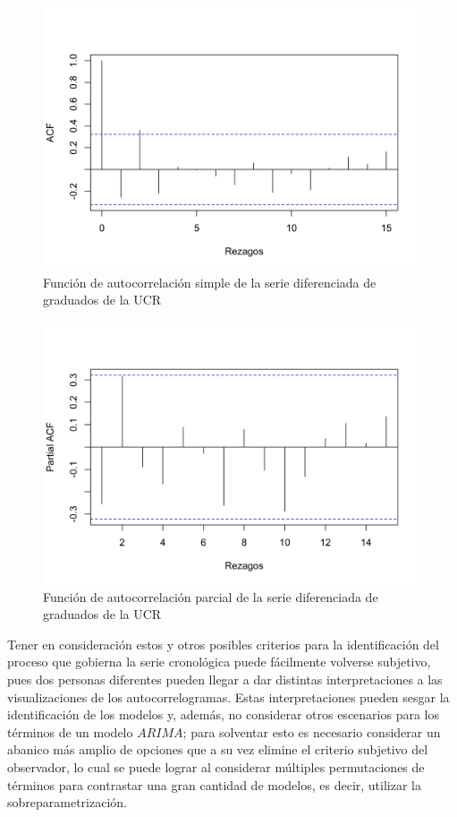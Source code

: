 \documentclass[
]{article}
\begin{document}
\begin{figure}[H]
\includegraphics[width=1\linewidth,height=1\textheight]{Tesis_files/figure-latex/auto_ucr2-1} \caption{Función de autocorrelación simple de la serie diferenciada de graduados de la UCR \textcolor{white}{prueba de aaaaaaaaaaaaaaaaaaaaaaa}}\label{fig:auto_ucr2}
\end{figure}

\begin{figure}[H]
\includegraphics[width=1\linewidth,height=1\textheight]{Tesis_files/figure-latex/parcial_ucr2-1} \caption{Función de autocorrelación parcial de la serie diferenciada de graduados de la UCR \textcolor{white}{prueba de aaaaaaaaaaaaaaaaaaaaaaa}}\label{fig:parcial_ucr2}
\end{figure}

Tener en consideración estos y otros posibles criterios para la
identificación del proceso que gobierna la serie cronológica puede
fácilmente volverse subjetivo, pues dos personas diferentes pueden
llegar a dar distintas interpretaciones a las visualizaciones de los
autocorrelogramas. Estas interpretaciones pueden sesgar la
identificación de los modelos y, además, no considerar otros escenarios
para los términos de un modelo \(ARIMA\); para solventar esto es
necesario considerar un abanico más amplio de opciones que a su vez
elimine el criterio subjetivo del observador, lo cual se puede lograr al
considerar múltiples permutaciones de términos para contrastar una gran
cantidad de modelos, es decir, utilizar la sobreparametrización.
\end{document}
